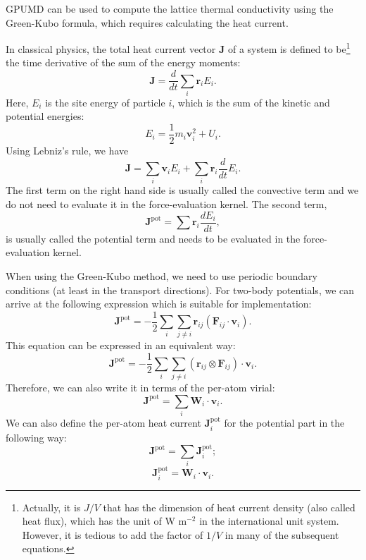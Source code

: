 \documentclass[12pt,a4paper]{report}
\newcommand{\vect}[1]{\boldsymbol{#1}}
\begin{document}
GPUMD can be used to compute the lattice thermal conductivity using the Green-Kubo \cite{green1954jcp,kubo1957jpsj} formula, which requires calculating the heat current.

In classical physics, the total heat current vector $\vect{J}$ of a system is defined to be\footnote{Actually, it is $J/V$ that has the dimension of heat current density (also called heat flux), which has the unit of W m$^{-2}$ in the international unit system. However, it is tedious to add the factor of $1/V$ in many of the subsequent equations.} the time derivative of the sum of the energy moments:
\begin{equation}
\vect{J} = \frac{d}{dt} \sum_i \vect{r}_i E_i.
\end{equation}
Here, $E_i$ is the site energy of particle $i$, which is the sum of the kinetic and potential energies:
\begin{equation}
E_i = \frac{1}{2}m_i \vect{v}_i^2 + U_i.
\end{equation}
Using Lebniz's rule, we have
\begin{equation}
\vect{J} = \sum_i \vect{v}_i E_i +  \sum_i \vect{r}_i \frac{d}{dt} E_i.
\end{equation}
The first term on the right hand side is usually called the convective term and we do not need to evaluate it in the force-evaluation kernel. The second term,
\begin{equation}
\vect{J}^{\text{pot}} = \sum \vect{r}_i \frac{d E_i} {dt},
\end{equation}
is usually called the potential term and needs to be evaluated in the force-evaluation kernel.

When using the Green-Kubo method, we need to use periodic boundary conditions (at least in the transport directions). For two-body potentials, we can arrive at the following expression which is suitable for implementation:
\begin{equation}
\vect{J}^{\text{pot}} = -\frac{1}{2} \sum_i \sum_{j \neq i}
\vect{r}_{ij}  \left( \vect{F}_{ij} \cdot \vect{v}_i \right).
\end{equation}
This equation can be expressed in an equivalent way:
\begin{equation}
\vect{J}^{\text{pot}} = -\frac{1}{2} \sum_i \sum_{j \neq i}
\left( \vect{r}_{ij} \otimes  \vect{F}_{ij} \right) \cdot \vect{v}_i .
\end{equation}
Therefore, we can also write it in terms of the per-atom virial:
\begin{equation}
\vect{J}^{\text{pot}} = \sum_i \textbf{W}_i \cdot \vect{v}_i.
\end{equation}
We can also define the per-atom heat current $\vect{J}_i^{\text{pot}}$ for the potential part in the following way:
\begin{equation}
\vect{J}^{\text{pot}} = \sum_i \vect{J}^{\text{pot}}_i;
\end{equation}
\begin{equation}
\vect{J}^{\text{pot}}_i = \textbf{W}_i \cdot \vect{v}_i.
\end{equation}
\end{document}
